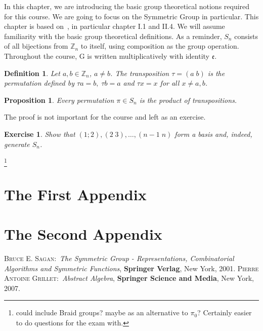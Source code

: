 \documentclass[a4paper,12pt,reqno]{amsbook}%
\theoremstyle{plain}
\newtheorem{definition}{Definition}
\newtheorem{exercise}{Exercise}
\newtheorem{proposition}{Proposition}
\numberwithin{equation}{section}
\begin{document}
In this chapter, we are introducing the basic group theoretical notions required for this course. We are going to focus on the Symmetric Group in particular. This chapter is based on~\cite{Grillet}, in particular chapter I.1 and II.4. We will assume familiarity with the basic group theoretical definitions. As a reminder, $S_n$ consists of all bijections from $\mathbb{Z}_n$ to itself, using composition as the group operation. Throughout the course, G is written multiplicatively with identity $\mathfrak{e}$.
\begin{definition}
Let $a,b\in\mathbb{Z}_n$, $a\neq b$. The \emph{transposition} $\tau=(a\;b)$ is the permutation defined by $\tau a=b,\;\tau b=a$ and $\tau x=x$ for all $x\neq a,b$.
\end{definition}
\begin{proposition}
Every permutation $\pi\in S_n$ is the product of transpositions.
\end{proposition}
The proof is not important for the course and left as an exercise.
\begin{exercise}
Show that $(1;2),(2\;3),\ldots,(n-1\;n)$ form a basis and, indeed, generate $S_n$.
\end{exercise}
\footnote{could include Braid groups? maybe as an alternative to $\pi_0$? Certainly easier to do questions for the exam with.}


\backmatter \appendix

\chapter{The First Appendix}


\chapter{The Second Appendix}


\begin{thebibliography}{9}
 \textsc{Bruce E. Sagan}:\ \textit{The Symmetric Group - Representations, Combinatorial Algorithms and Symmetric Functions}, \textbf{Springer Verlag}, New York, 2001.
 \textsc{Pierre Antoine Grillet}:\ \textit{Abstract Algebra}, \textbf{Springer Science and Media}, New York, 2007.
\end{thebibliography}
\end{document}
